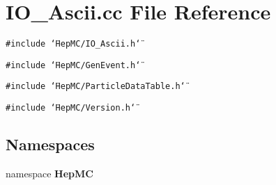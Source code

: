 \section{IO\_\-Ascii.cc File Reference}
\label{IO__Ascii_8cc}
{\tt \#include \char`\"{}Hep\-MC/IO\_\-Ascii.h\char`\"{}}\par
{\tt \#include \char`\"{}Hep\-MC/Gen\-Event.h\char`\"{}}\par
{\tt \#include \char`\"{}Hep\-MC/Particle\-Data\-Table.h\char`\"{}}\par
{\tt \#include \char`\"{}Hep\-MC/Version.h\char`\"{}}\par
\subsection*{Namespaces}
\begin{CompactItemize}
\item 
namespace {\bf Hep\-MC}
\end{CompactItemize}
